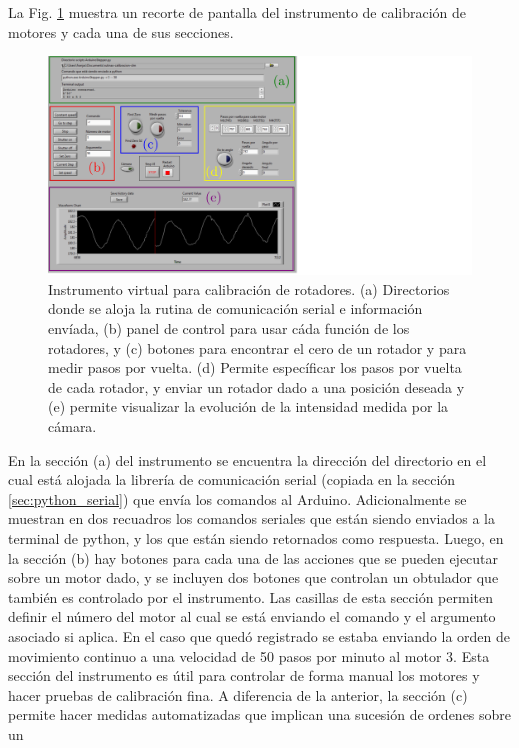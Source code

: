 La Fig. \ref{fig:plano_ensamble} muestra un recorte de
pantalla del instrumento de calibración de motores y cada una de sus secciones.
\begin{figure}
\centering
\includegraphics[scale = .5]{polarizer_calib.pdf} 
\caption[Interfaz del programa para calibración de
motores.]{Instrumento virtual para calibración de rotadores. (a)
  Directorios donde se aloja la rutina de comunicación serial e
  información envíada, (b) panel de control para usar cáda función de
  los rotadores, y (c) botones para encontrar el cero de un rotador y
  para medir pasos por vuelta. (d) Permite específicar los pasos por
  vuelta de cada rotador, y enviar un rotador dado a una posición
  deseada y (e) permite visualizar la evolución de la intensidad
  medida por la cámara. }
\label{fig:plano_ensamble}
\end{figure}
En la sección (a) del instrumento se encuentra la dirección del
directorio en el cual está alojada la librería de comunicación serial
(copiada en la sección \ref{sec:python_serial})
que envía los comandos al Arduino. Adicionalmente se muestran en dos
recuadros los comandos seriales que están siendo enviados a la
terminal de python, y los que están siendo retornados como respuesta.
Luego, en la sección (b) hay botones para cada una de las acciones que
se pueden ejecutar sobre un motor dado, y se incluyen dos botones que
controlan un obtulador que también es controlado por el
instrumento. Las casillas de esta sección 
permiten definir el número del motor al cual se está enviando el
comando y el argumento asociado si aplica. En el caso que quedó
registrado se estaba enviando la orden de movimiento continuo a una
velocidad de 50 pasos por minuto al motor 3. Esta sección del instrumento es útil para
controlar de forma manual los motores y hacer pruebas de calibración
fina. A diferencia de la anterior, la sección (c) permite hacer
medidas automatizadas que implican una sucesión de ordenes sobre un
